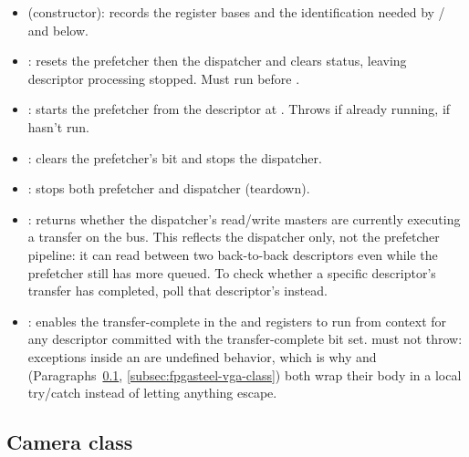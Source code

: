 \begin{itemize}
    \item {} (constructor): records the register bases and the  identification needed by / and  below.
    \item {}: resets the prefetcher then the dispatcher and clears status, leaving descriptor processing stopped. Must run before .
    \item {}: starts the prefetcher from the descriptor at . Throws  if already running,  if  hasn't run.
    \item {}: clears the prefetcher's  bit and stops the dispatcher.
    \item {}: stops both prefetcher and dispatcher (teardown).
    \item {}: returns whether the dispatcher's read/write masters are currently executing a transfer on the bus. This reflects the dispatcher only, not the prefetcher pipeline: it can read  between two back-to-back descriptors even while the prefetcher still has more queued. To check whether a specific descriptor's transfer has completed, poll that descriptor's  instead.
    \item {}: enables the transfer-complete  in the  and registers  to run from  context for any descriptor committed with the transfer-complete  bit set.  must not throw: exceptions inside an  are undefined behavior, which is why  and  (Paragraphs~\ref{subsec:fpgasteel-camera-class}, \ref{subsec:fpgasteel-vga-class}) both wrap their body in a local try/catch instead of letting anything escape.
\end{itemize}

\subsection{Camera class}
\label{subsec:fpgasteel-camera-class}


